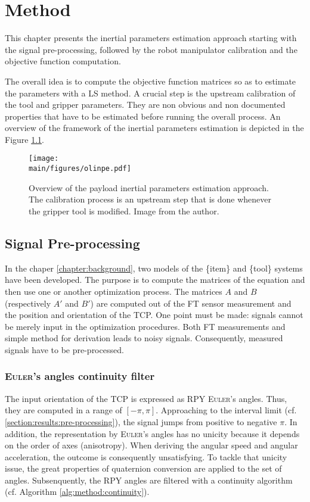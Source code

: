 \documentclass[/home/francois/latex/report/main.tex]{subfiles}
\begin{document}
\chapter{Method}
\label{chapter:method}

This chapter presents the inertial parameters estimation approach starting with the signal pre-processing, followed by the robot manipulator calibration and the objective function computation.

The overall idea is to compute the objective function matrices so as to estimate the parameters with a \ac{LS} method. A crucial step is the upstream calibration of the tool and gripper parameters. They are non obvious and non documented properties that have to be estimated before running the overall process. An overview of the framework of the inertial parameters estimation is depicted in the Figure \ref{fig:method:overall}.

\begin{figure}[H]
  \centering
  \texttt{[image: \\main/figures/olinpe.pdf]}
  \caption{Overview of the payload inertial parameters estimation approach. The calibration process is an upstream step that is done whenever the gripper tool is modified. Image from  the author.}
  \label{fig:method:overall}
\end{figure}

\section{Signal Pre-processing}
\label{section:pre-pro}

In the chaper \ref{chapter:background}, two models of the \{item\} and \{tool\} systems have been developed. The purpose is to compute the matrices of the equation and then use one or another optimization process. The matrices $A$ and $B$ (respectively $A'$ and $B'$) are computed out of the \ac{FT} sensor measurement and the position and orientation of the \ac{TCP}. One point must be made: signals cannot be merely input in the optimization procedures. Both \ac{FT} measurements and simple method for derivation leads to noisy signals. Consequently, measured signals have to be pre-processed.

\subsection{\textsc{Euler}'s angles continuity filter}

The input orientation of the \ac{TCP} is expressed as \ac{RPY} \textsc{Euler}'s angles. Thus, they are computed in a range of $[-\pi, \pi]$. Approaching to the interval limit (cf. \ref{section:results:pre-processing}), the signal jumps from positive to negative $\pi$. In addition, the representation by \textsc{Euler}'s angles has no unicity because it depends on the order of axes (anisotropy). When deriving the angular speed and angular acceleration, the outcome is consequently unsatisfying. To tackle that unicity issue, the great properties of quaternion conversion are applied to the set of angles. Subsenquently, the \ac{RPY} angles are filtered with a continuity algorithm (cf. Algorithm \ref{alg:method:continuity}).
\end{document}
